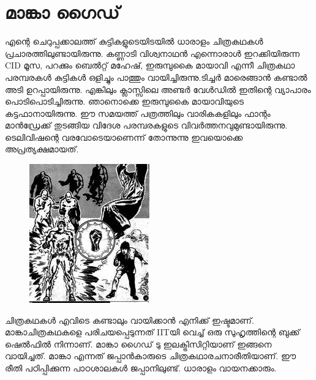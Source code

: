\documentclass[10pt,a4paper]{report}
\begin{document}
   \section{മാങ്കാ ഗൈഡ്}
എന്റെ ചെറുപ്പക്കാലത്ത് കുട്ടികളുടെയിടയില്‍ ധാരാളം ചിത്രകഥകള്‍ പ്രചാരത്തിലുണ്ടായിരുന്നു. കണ്ണാടി വിശ്വനാഥന്‍ എന്നൊരാള്‍ ഇറക്കിയിരുന്ന CID മൂസ, പറക്കും ബെല്‍റ്റ് മഹേഷ്, ഇരുമ്പുകൈ മായാവി എന്നീ ചിത്രകഥാ പരമ്പരകള്‍ കുട്ടികള്‍ ഒളിച്ചും പാത്തും വായിച്ചിരുന്നു.ടിച്ചർ മാരെങ്ങാൻ  കണ്ടാൽ അടി ഉറപ്പായിരുന്നു. എങ്കിലും ക്ലാസ്സിലെ അണ്ടർ വേൾഡിൽ  ഇതിന്റെ വ്യാപാരം  പൊടിപൊടിച്ചിരുന്നു.   ഞാനൊക്കെ ഇരുമ്പുകൈ മായാവിയുടെ കട്ടഫാനായിരുന്നു. ഈ സമയത്ത് പത്രത്തിലും വാരികകളിലും ഫാന്റം മാന്‍ഡ്രേക്ക് തുടങ്ങിയ വിദേശ പരമ്പരകളുടെ വിവര്‍ത്തനവുമുണ്ടായിരുന്നു. ടെലിവിഷന്റെ വരവോടെയാണെന്ന് തോന്നുന്നു ഇവയൊക്കെ അപ്രത്യക്ഷമായത്.
 \begin{figure}[H]
  \center
\includegraphics[scale=.55]{images/manga1}
\label{manga1}
\caption{   }
\end{figure}

     ചിത്രകഥകള്‍ എവിടെ കണ്ടാലും വായിക്കാന്‍ എനിക്ക് ഇഷ്ടമാണ്. മാങ്കാചിത്രകഥകളെ പരിചയപ്പെടുന്നത് IITയി വെച്ച് ഒരു സുഹൃത്തിന്റെ ബുക്ക് ഷെല്‍ഫില്‍ നിന്നാണ്. മാങ്കാ ഗൈഡ് ടു ഇലക്ട്രിസിറ്റിയാണ് ഇങ്ങനെ വായിച്ചത്.
           മാങ്കാ എന്നത് ജപ്പാന്‍കാരുടെ ചിത്രകഥാരചനാരീതിയാണ്. ഈ രീതി പഠിപ്പിക്കുന്ന പാഠശാലകള്‍ ജപ്പാനിലുണ്ട്. ധാരാളം വായനക്കാരും.
\end{document}
